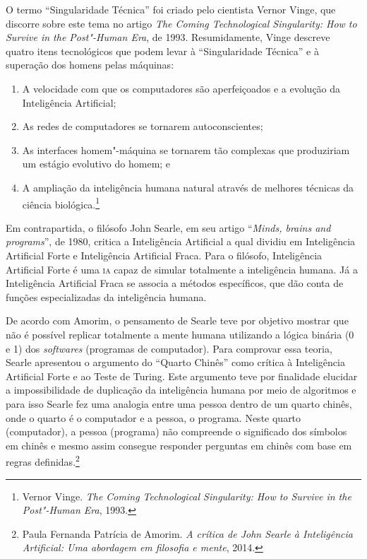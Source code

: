 O termo ``Singularidade Técnica'' foi criado pelo cientista Vernor
Vinge, que discorre sobre este tema no artigo \emph{The Coming
Technological Singularity: How to Survive in the Post"-Human Era}, de 1993.
Resumidamente, Vinge descreve quatro itens tecnológicos
que podem levar à ``Singularidade Técnica'' e à superação dos homens
pelas máquinas:

\begin{enumerate}
\item A velocidade com que os computadores são aperfeiçoados e a evolução da Inteligência Artificial;

\item As redes de computadores se tornarem autoconscientes;

\item As interfaces homem"-máquina se tornarem tão complexas que produziriam um estágio evolutivo do homem; e

\item A ampliação da inteligência humana natural através de melhores
técnicas da ciência biológica.\footnote{Vernor Vinge. \emph{The Coming
Technological Singularity: How to Survive in the Post"-Human Era}, 1993.}
\end{enumerate}

Em contrapartida, o filósofo John Searle, em seu artigo ``\emph{Minds,
brains and programs}'', de 1980, critica a Inteligência
Artificial a qual dividiu em Inteligência Artificial Forte e
Inteligência Artificial Fraca. Para o filósofo, Inteligência Artificial
Forte é uma \textsc{ia} capaz de simular totalmente a inteligência humana. Já a
Inteligência Artificial Fraca se associa a métodos específicos, que dão
conta de funções especializadas da inteligência humana.

De acordo com Amorim, o pensamento de Searle teve por objetivo
mostrar que não é possível replicar totalmente a mente humana utilizando
a lógica binária (0 e 1) dos \emph{softwares} (programas de computador). Para
comprovar essa teoria, Searle apresentou o argumento do ``Quarto
Chinês'' como crítica à Inteligência Artificial Forte e ao Teste de
Turing. Este argumento teve por finalidade elucidar a impossibilidade de
duplicação da inteligência humana por meio de algoritmos e para isso
Searle fez uma analogia entre uma pessoa dentro de um quarto chinês,
onde o quarto é o computador e a pessoa, o programa. Neste quarto
(computador), a pessoa (programa) não compreende o significado dos
símbolos em chinês e mesmo assim consegue responder perguntas em chinês
com base em regras definidas.\footnote{Paula Fernanda Patrícia de Amorim. \emph{A crítica de John Searle à Inteligência Artificial: Uma abordagem em filosofia e mente}, 2014.}

